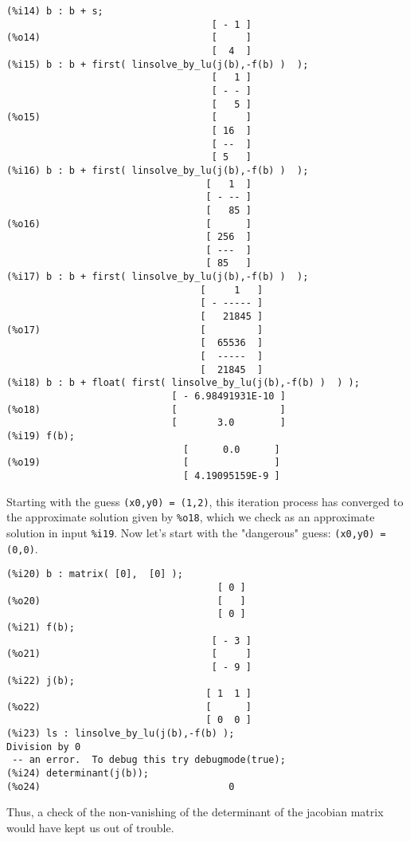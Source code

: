 \documentclass[12pt]{article}
\begin{document}
\newpage
\begin{verbatim}
(%i14) b : b + s;
                                    [ - 1 ]
(%o14)                              [     ]
                                    [  4  ]
(%i15) b : b + first( linsolve_by_lu(j(b),-f(b) )  );
                                    [   1 ]
                                    [ - - ]
                                    [   5 ]
(%o15)                              [     ]
                                    [ 16  ]
                                    [ --  ]
                                    [ 5   ]
(%i16) b : b + first( linsolve_by_lu(j(b),-f(b) )  );
                                   [   1  ]
                                   [ - -- ]
                                   [   85 ]
(%o16)                             [      ]
                                   [ 256  ]
                                   [ ---  ]
                                   [ 85   ]
(%i17) b : b + first( linsolve_by_lu(j(b),-f(b) )  );
                                  [     1   ]
                                  [ - ----- ]
                                  [   21845 ]
(%o17)                            [         ]
                                  [  65536  ]
                                  [  -----  ]
                                  [  21845  ]
(%i18) b : b + float( first( linsolve_by_lu(j(b),-f(b) )  ) );
                             [ - 6.98491931E-10 ]
(%o18)                       [                  ]
                             [       3.0        ]				
(%i19) f(b);
                               [      0.0      ]
(%o19)                         [               ]
                               [ 4.19095159E-9 ]							 
\end{verbatim}
\normalsize
Starting with the guess \verb|(x0,y0) = (1,2)|, this iteration process
  has converged to the approximate solution given by \verb|%o18|, which we
  check as an approximate solution in input \verb|%i19|.
Now let's start with the "dangerous" guess: \verb|(x0,y0) = (0,0)|.
\small
\begin{verbatim}
(%i20) b : matrix( [0],  [0] );
                                     [ 0 ]
(%o20)                               [   ]
                                     [ 0 ]
(%i21) f(b);
                                    [ - 3 ]
(%o21)                              [     ]
                                    [ - 9 ]
(%i22) j(b);
                                   [ 1  1 ]
(%o22)                             [      ]
                                   [ 0  0 ]
(%i23) ls : linsolve_by_lu(j(b),-f(b) );
Division by 0
 -- an error.  To debug this try debugmode(true);
(%i24) determinant(j(b));
(%o24)                                 0
\end{verbatim}
\normalsize
Thus, a check of the non-vanishing of the determinant of the jacobian
  matrix would have kept us out of trouble.
\end{document}
